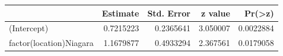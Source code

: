 \documentclass[]{article}
\begin{document}
\begin{longtable}[]{@{}lrrrr@{}}
\toprule
& Estimate & Std. Error & z value &
Pr(\textgreater{}\textbar{}z\textbar{})\tabularnewline
\midrule
\endhead
(Intercept) & 0.7215223 & 0.2365641 & 3.050007 &
0.0022884\tabularnewline
factor(location)Niagara & 1.1679877 & 0.4933294 & 2.367561 &
0.0179058\tabularnewline
\bottomrule
\end{longtable}
\end{document}
